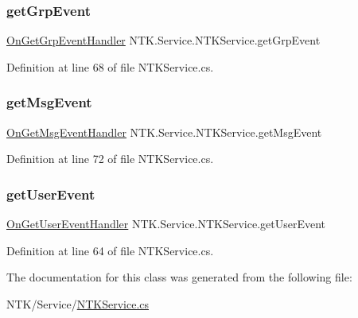 \subsubsection{\texorpdfstring{getGrpEvent}{getGrpEvent}}
{\footnotesize\ttfamily \mbox{\hyperlink{namespace_n_t_k_1_1_service_ad014f00ab4e82ad6ce8808bb063f8b31}{On\+Get\+Grp\+Event\+Handler}} N\+T\+K.\+Service.\+N\+T\+K\+Service.\+get\+Grp\+Event}







Definition at line 68 of file N\+T\+K\+Service.\+cs.

\mbox{\label{class_n_t_k_1_1_service_1_1_n_t_k_service_a35f5c3965b620753a16a413fcea7a2d4}} 
\subsubsection{\texorpdfstring{getMsgEvent}{getMsgEvent}}
{\footnotesize\ttfamily \mbox{\hyperlink{namespace_n_t_k_1_1_service_a937b2f893bc924fb0e8aaeac52f0f18e}{On\+Get\+Msg\+Event\+Handler}} N\+T\+K.\+Service.\+N\+T\+K\+Service.\+get\+Msg\+Event}







Definition at line 72 of file N\+T\+K\+Service.\+cs.

\mbox{\label{class_n_t_k_1_1_service_1_1_n_t_k_service_a469c4b12ce0ec00a7ec292bcb3a2aa95}} 
\subsubsection{\texorpdfstring{getUserEvent}{getUserEvent}}
{\footnotesize\ttfamily \mbox{\hyperlink{namespace_n_t_k_1_1_service_a51bf57675f3325cb27da64ad2987252b}{On\+Get\+User\+Event\+Handler}} N\+T\+K.\+Service.\+N\+T\+K\+Service.\+get\+User\+Event}







Definition at line 64 of file N\+T\+K\+Service.\+cs.



The documentation for this class was generated from the following file\+:\begin{DoxyCompactItemize}
\item 
N\+T\+K/\+Service/\mbox{\hyperlink{_n_t_k_service_8cs}{N\+T\+K\+Service.\+cs}}\end{DoxyCompactItemize}
